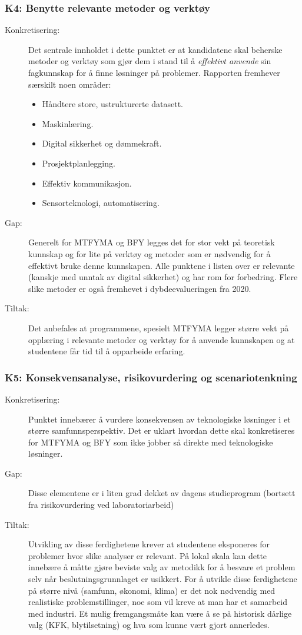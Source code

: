 \subsubsection{K4: Benytte relevante metoder og verktøy}
\begin{description}
\item[Konkretisering:] Det sentrale innholdet i dette punktet er at kandidatene skal beherske metoder og verktøy som gjør dem i stand til å \emph{effektivt anvende} sin fagkunnskap for å finne løsninger på problemer. Rapporten fremhever særskilt noen områder:
\begin{itemize}
	\item Håndtere store, ustrukturerte datasett.
	\item Maskinlæring.
	\item Digital sikkerhet og dømmekraft.
	\item Prosjektplanlegging.
	\item Effektiv kommunikasjon.
	\item Sensorteknologi, automatisering.
\end{itemize}

\item[Gap:]Generelt for MTFYMA og BFY legges det for stor vekt på teoretisk kunnskap og for lite på verktøy og metoder som er nødvendig for å effektivt bruke denne kunnskapen. Alle punktene i listen over er relevante (kanskje med unntak av digital sikkerhet) og har rom for forbedring. Flere slike metoder er også fremhevet i dybdeevalueringen fra 2020. 
\item[Tiltak:]Det anbefales at programmene, spesielt MTFYMA legger større vekt på opplæring i relevante metoder og verktøy for å anvende kunnskapen og at studentene får tid til å opparbeide erfaring.
\end{description}


\subsubsection{K5: Konsekvensanalyse, risikovurdering og scenariotenkning}
\begin{description}
\item[Konkretisering:] Punktet innebærer å vurdere konsekvensen av teknologiske løsninger i et større samfunnsperspektiv. Det er uklart hvordan dette skal konkretiseres for MTFYMA og BFY som ikke jobber så direkte med teknologiske løsninger.
\item[Gap:]Disse elementene er i liten grad dekket av dagens studieprogram (bortsett fra risikovurdering ved laboratoriarbeid)
\item[Tiltak:]Utvikling av disse ferdighetene krever at studentene eksponeres for problemer hvor slike analyser er relevant. På lokal skala kan dette innebære å måtte gjøre beviste valg av metodikk for å besvare et problem selv når beslutningsgrunnlaget er usikkert. For å utvikle disse ferdighetene på større nivå (samfunn, økonomi, klima) er det nok nødvendig med realistiske problemstillinger, noe som vil kreve at man har et samarbeid med industri. Et mulig fremgangsmåte kan være å se på historisk dårlige valg (KFK, blytilsetning) og hva som kunne vært gjort annerledes.
\end{description}

